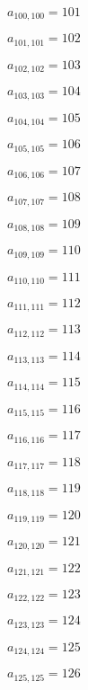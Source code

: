 \documentclass[a4paper,12pt]{article}
\begin{document}
$a _{ 100, 100 } = 101$

$a _{ 101, 101 } = 102$

$a _{ 102, 102 } = 103$

$a _{ 103, 103 } = 104$

$a _{ 104, 104 } = 105$

$a _{ 105, 105 } = 106$

$a _{ 106, 106 } = 107$

$a _{ 107, 107 } = 108$

$a _{ 108, 108 } = 109$

$a _{ 109, 109 } = 110$

$a _{ 110, 110 } = 111$

$a _{ 111, 111 } = 112$

$a _{ 112, 112 } = 113$

$a _{ 113, 113 } = 114$

$a _{ 114, 114 } = 115$

$a _{ 115, 115 } = 116$

$a _{ 116, 116 } = 117$

$a _{ 117, 117 } = 118$

$a _{ 118, 118 } = 119$

$a _{ 119, 119 } = 120$

$a _{ 120, 120 } = 121$

$a _{ 121, 121 } = 122$

$a _{ 122, 122 } = 123$

$a _{ 123, 123 } = 124$

$a _{ 124, 124 } = 125$

$a _{ 125, 125 } = 126$
\end{document}
